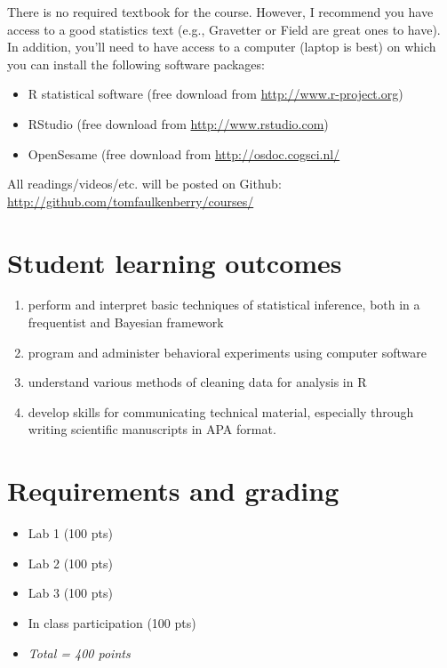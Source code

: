 \documentclass[10pt]{article}
\begin{document}
There is no required textbook for the course. However, I recommend you have access to a good statistics text (e.g., Gravetter or Field are great ones to have).  In addition, you'll need to have access to a computer (laptop is best) on which you can install the following software packages:

\begin{itemize}
\item R statistical software (free download from \href{http://www.r-project.org}{\url{http://www.r-project.org}})
\item RStudio (free download from \href{http://www.rstudio.com}{\url{http://www.rstudio.com}})
\item OpenSesame (free download from \url{http://osdoc.cogsci.nl/}
\end{itemize}

All readings/videos/etc. will be posted on Github: \url{http://github.com/tomfaulkenberry/courses/}

\section*{Student learning outcomes}
\label{sec-4}

\begin{enumerate}
\item perform and interpret basic techniques of statistical inference, both in a frequentist and Bayesian framework
\item program and administer behavioral experiments using computer software
\item understand various methods of cleaning data for analysis in R
\item develop skills for communicating technical material, especially through writing scientific manuscripts in APA format.
\end{enumerate}

\section*{Requirements and grading}
\label{sec-5}

\begin{itemize}
\item Lab 1 (100 pts)
\item Lab 2 (100 pts)
\item Lab 3 (100 pts)
\item In class participation (100 pts)
\item \emph{Total = 400 points}
\end{itemize}
\end{document}
